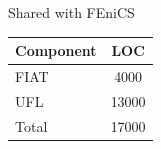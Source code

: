 \documentclass[presentation]{beamer}
\begin{document}
\begin{frame}
\begin{overlayarea}{\textwidth}{0.8\textheight}
\begin{onlyenv}
\begin{columns}
\begin{column}[t]{0.5\textwidth}
      \begin{block}{Shared with FEniCS}
        \begin{table}
          \centering
          \begin{tabular}{lc}
            Component & LOC   \\
            \hline
            FIAT      & 4000  \\
            UFL       & 13000 \\
            \hline
            Total     & 17000
          \end{tabular}
        \end{table}        
      \end{block}
    \end{column}
  \end{columns}
    \end{onlyenv}
  \end{overlayarea}
\end{frame}
\end{document}
